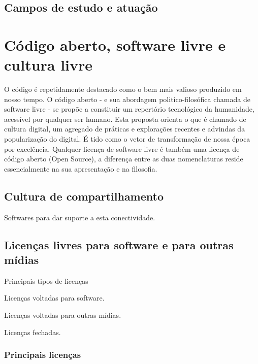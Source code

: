 \subsection{Campos de estudo e atuação}

\section{Código aberto, software livre e cultura livre} %

O código é repetidamente destacado como o bem mais valioso produzido em nosso tempo.
O código aberto - e sua abordagem politico-filosófica chamada de software livre -
se propõe a constituir um repertório tecnológico da humanidade, acessível por
qualquer ser humano. Esta proposta orienta o que é chamado de cultura digital,
um agregado de práticas e explorações recentes e advindas da popularização do digital.
É tido como o vetor de transformação de nossa época por excelência.
Qualquer licença de software livre é também uma licença de código aberto (Open Source), a diferença entre as duas nomenclaturas reside essencialmente na sua apresentação e na filosofia.




\subsection{Cultura de compartilhamento} %
\label{sec:soft_compar} %

Softwares para dar suporte a esta conectividade.

\subsection{Licenças livres para software e para outras mídias}
\label{sec:licencas_livres}

Principais tipos de licenças

Licenças voltadas para software.

Licenças voltadas para outras mídias.

Licenças fechadas.

\subsubsection{Principais licenças}
\label{sec:princ_licencas}




